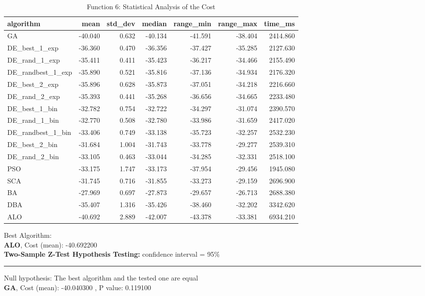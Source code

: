 \documentclass[12pt]{article}
\begin{document}
\begin{table}[H]
    \centering
    \footnotesize
    \begin{adjustbox}{width=1\textwidth}
        \begin{tabular}{lrrrrrr}
            \toprule
            algorithm &    mean &  std\_dev &  median &  range\_min &  range\_max &  time\_ms \\
            \midrule
            GA & -40.040 & 0.632 & -40.134 & -41.591 & -38.404 & 2414.860 \\
            DE\_best\_1\_exp & -36.360 & 0.470 & -36.356 & -37.427 & -35.285 & 2127.630 \\
            DE\_rand\_1\_exp & -35.411 & 0.411 & -35.423 & -36.217 & -34.466 & 2155.490 \\
            DE\_randbest\_1\_exp & -35.890 & 0.521 & -35.816 & -37.136 & -34.934 & 2176.320 \\
            DE\_best\_2\_exp & -35.896 & 0.628 & -35.873 & -37.051 & -34.218 & 2216.660 \\
            DE\_rand\_2\_exp & -35.393 & 0.441 & -35.268 & -36.656 & -34.665 & 2233.480 \\
            DE\_best\_1\_bin & -32.782 & 0.754 & -32.722 & -34.297 & -31.074 & 2390.570 \\
            DE\_rand\_1\_bin & -32.770 & 0.508 & -32.780 & -33.986 & -31.659 & 2417.020 \\
            DE\_randbest\_1\_bin & -33.406 & 0.749 & -33.138 & -35.723 & -32.257 & 2532.230 \\
            DE\_best\_2\_bin & -31.684 & 1.004 & -31.743 & -33.778 & -29.277 & 2539.310 \\
            DE\_rand\_2\_bin & -33.105 & 0.463 & -33.044 & -34.285 & -32.331 & 2518.100 \\
            PSO & -33.175 & 1.747 & -33.173 & -37.954 & -29.456 & 1945.080 \\
            SCA & -31.745 & 0.716 & -31.855 & -33.273 & -29.159 & 2696.900 \\
            BA & -27.969 & 0.697 & -27.873 & -29.657 & -26.713 & 2688.380 \\
            DBA & -35.407 & 1.316 & -35.426 & -38.460 & -32.202 & 3342.620 \\
            ALO & -40.692 & 2.889 & -42.007 & -43.378 & -33.381 & 6934.210 \\
            \bottomrule
        \end{tabular}
        
        
    \end{adjustbox}
    \caption{Function 6: Statistical Analysis of the Cost} 
\end{table}
Best Algorithm: \\
\textbf{ALO}, Cost (mean): -40.692200\\
\noindent
\textbf{Two-Sample Z-Test Hypothesis Testing: }
confidence interval = 95\%\\
\vspace{-3mm}
\rule[3mm]{\linewidth}{0.2pt}
Null hypothesis: The best algorithm and the tested one are equal\\
\textbf{GA}, Cost (mean): -40.040300
, P value: 0.119100\\
\newpage
\end{document}
